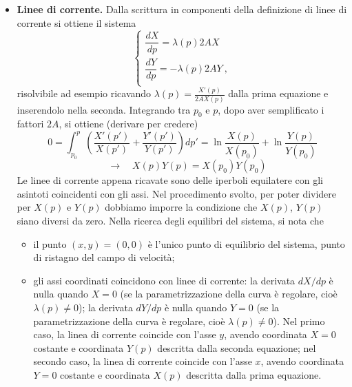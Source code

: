 \begin{itemize}
\item \textbf{Linee di corrente.} Dalla scrittura in componenti della definizione di linee di corrente si ottiene il sistema 
\begin{equation}
 \begin{cases}
  \dfrac{dX}{dp} = \lambda(p) 2 A X \\
  \dfrac{dY}{dp} = - \lambda(p) 2 A Y \ , \\
 \end{cases}
\end{equation}
risolvibile ad esempio ricavando $\lambda(p) = \frac{X'(p)}{2 A X(p)}$ dalla prima equazione e inserendolo nella seconda. Integrando tra $p_0$ e $p$, dopo aver semplificato i fattori $2 A$, si ottiene (derivare per credere)
\begin{equation}
 0 = \int_{p_0}^{p} \left( \dfrac{X'(p')}{X(p')} + \dfrac{Y'(p')}{Y(p')} \right) dp' =
 \ln{\dfrac{X(p)}{X(p_0)}} + \ln{\dfrac{Y(p)}{Y(p_0)}}
\end{equation} \vspace{-0.5cm}
\begin{equation}
 \quad \rightarrow \quad
 X(p)Y(p) = X(p_0)Y(p_0)
\end{equation}
Le linee di corrente appena ricavate sono delle iperboli equilatere con gli asintoti coincidenti con gli assi. Nel procedimento svolto, per poter dividere per $X(p)$ e $Y(p)$ dobbiamo imporre la condizione che $X(p)$, $Y(p)$ siano diversi da zero. Nella ricerca degli equilibri del sistema, si nota che
\begin{itemize}
 \item il punto $(x,y) = (0,0)$ è l'unico punto di equilibrio del sistema, punto di ristagno del campo di velocità;
 \item gli assi coordinati coincidono con linee di corrente: la derivata $dX/dp$ è nulla quando $X=0$ (se la parametrizzazione della curva è regolare, cioè $\lambda(p) \ne 0$); la derivata $dY/dp$ è nulla quando $Y=0$ (se la parametrizzazione della curva è regolare, cioè $\lambda(p) \ne 0$). Nel primo caso, la linea di corrente coincide con l'asse $y$, avendo coordinata $X=0$ costante e coordinata $Y(p)$ descritta dalla seconda equazione; nel secondo caso, la linea di corrente coincide con l'asse $x$, avendo coordinata $Y=0$ costante e coordinata $X(p)$ descritta dalla prima equazione.
\end{itemize}


\end{itemize}
